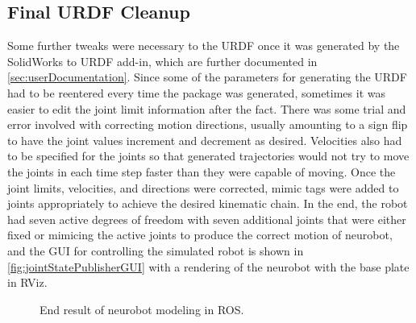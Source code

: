 \documentclass[12pt]{report}
\begin{document}
\subsection{Final URDF Cleanup}
Some further tweaks were necessary to the URDF once it was generated by the SolidWorks to URDF add-in, which are further documented in \autoref{sec:userDocumentation}. Since some of the parameters for generating the URDF had to be reentered every time the package was generated, sometimes it was easier to edit the joint limit information after the fact. There was some trial and error involved with correcting motion directions, usually amounting to a sign flip to have the joint values increment and decrement as desired. Velocities also had to be specified for the joints so that generated trajectories would not try to move the joints in each time step faster than they were capable of moving. Once the joint limits, velocities, and directions were corrected, mimic tags were added to joints appropriately to achieve the desired kinematic chain. In the end, the robot had seven active degrees of freedom with seven additional joints that were either fixed or mimicing the active joints to produce the correct motion of neurobot, and the GUI for controlling the simulated robot is shown in \autoref{fig:jointStatePublisherGUI} with a rendering of the neurobot with the base plate in RViz.

\begin{figure}[thpb]
	\centering
  \hfill
    \caption{End result of neurobot modeling in ROS.}
    \label{fig:jointStatePublisherGUI}
\end{figure}
\end{document}
